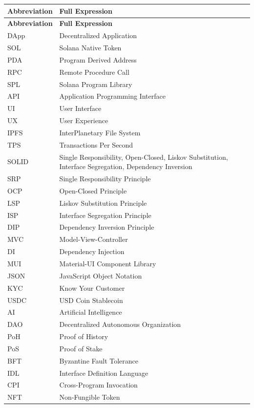 \documentclass[a4paper,13pt,twoside]{report}
\theoremstyle{definition}
\begin{document}
\begin{longtable}{p{3cm}p{10cm}}
\textbf{Abbreviation} & \textbf{Full Expression} \\
\hline
\endfirsthead
\textbf{Abbreviation} & \textbf{Full Expression} \\
\hline
\endhead
DApp & Decentralized Application \\
SOL & Solana Native Token \\
PDA & Program Derived Address \\
RPC & Remote Procedure Call \\
SPL & Solana Program Library \\
API & Application Programming Interface \\
UI & User Interface \\
UX & User Experience \\
IPFS & InterPlanetary File System \\
TPS & Transactions Per Second \\
SOLID & Single Responsibility, Open-Closed, Liskov Substitution, Interface Segregation, Dependency Inversion \\
SRP & Single Responsibility Principle \\
OCP & Open-Closed Principle \\
LSP & Liskov Substitution Principle \\
ISP & Interface Segregation Principle \\
DIP & Dependency Inversion Principle \\
MVC & Model-View-Controller \\
DI & Dependency Injection \\
MUI & Material-UI Component Library \\
JSON & JavaScript Object Notation \\
KYC & Know Your Customer \\
USDC & USD Coin Stablecoin \\
AI & Artificial Intelligence \\
DAO & Decentralized Autonomous Organization \\
PoH & Proof of History \\
PoS & Proof of Stake \\
BFT & Byzantine Fault Tolerance \\
IDL & Interface Definition Language \\
CPI & Cross-Program Invocation \\
NFT & Non-Fungible Token \\
\end{longtable}
\end{document}
